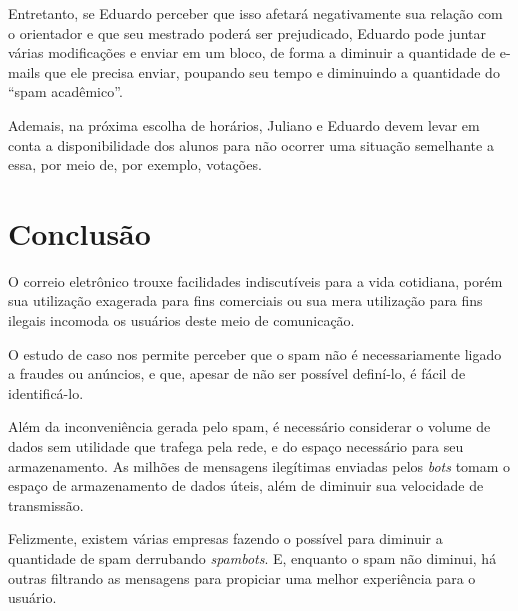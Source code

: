 \documentclass[a4paper,dvipdfm]{article}
\begin{document}
		Entretanto, se Eduardo perceber que isso afetará negativamente sua relação com o orientador e que seu mestrado poderá ser prejudicado, Eduardo pode juntar várias modificações e enviar em um bloco, de forma a diminuir a quantidade de e-mails que ele precisa enviar, poupando seu tempo e diminuindo a quantidade do ``spam acadêmico''.
		
		Ademais, na próxima escolha de horários, Juliano e Eduardo devem levar em conta a disponibilidade dos alunos para não ocorrer uma situação semelhante a essa, por meio de, por exemplo, votações.
		
\newpage
\section{Conclusão}
	O correio eletrônico trouxe facilidades indiscutíveis para a vida cotidiana, porém sua utilização exagerada para fins comerciais ou sua mera utilização para fins ilegais incomoda os usuários deste meio de comunicação.
	
	O estudo de caso nos permite perceber que o spam não é necessariamente ligado a fraudes ou anúncios, e que, apesar de não ser possível definí-lo, é fácil de identificá-lo.
	
	Além da inconveniência gerada pelo spam, é necessário considerar o volume de dados sem utilidade que trafega pela rede, e do espaço necessário para seu armazenamento.
	As milhões de mensagens ilegítimas enviadas pelos \emph{bots} tomam o espaço de armazenamento de dados úteis, além de diminuir sua velocidade de transmissão.
	
	Felizmente, existem várias empresas fazendo o possível para diminuir a quantidade de spam derrubando \emph{spambots}.
	E, enquanto o spam não diminui, há outras filtrando as mensagens para propiciar uma melhor experiência para o usuário.
\newpage
\printglossaries
{}

\newpage



%
\end{document}
